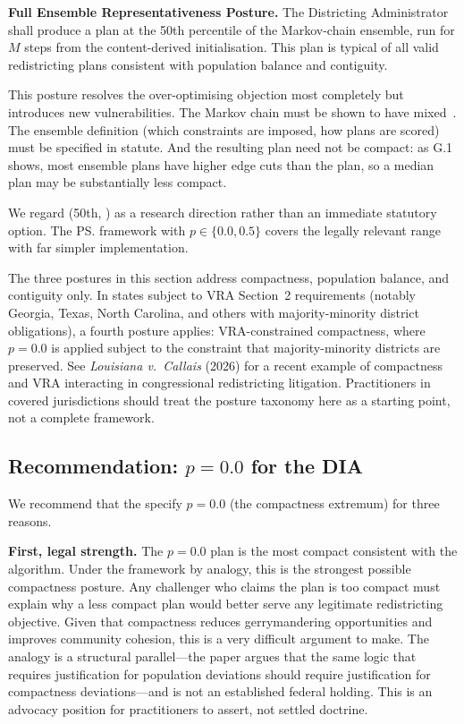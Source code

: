\begin{statute}
\textbf{Full Ensemble Representativeness Posture.}
The Districting Administrator shall produce a plan at the 50th percentile
of the \recom{} Markov-chain ensemble, run for $M$ steps from the
content-derived initialisation.
This plan is typical of all valid redistricting plans consistent with
population balance and contiguity.
\end{statute}

This posture resolves the over-optimising objection most completely but
introduces new vulnerabilities.
The Markov chain must be shown to have mixed~\citep{deford2021}.
The ensemble definition (which constraints are imposed, how plans are scored)
must be specified in statute.
And the resulting plan need not be compact: as G.1 shows, most \recom{}
ensemble plans have higher edge cuts than the \ar{} plan, so a median
\recom{} plan may be substantially less compact.

We regard \ts{}(50th, \recom{}) as a research direction rather than an
immediate statutory option.
The \ps{} framework with $p \in \{0.0, 0.5\}$ covers the legally relevant
range with far simpler implementation.

The three postures in this section address compactness, population balance,
and contiguity only.
In states subject to VRA Section~2 requirements (notably Georgia, Texas,
North Carolina, and others with majority-minority district obligations), a
fourth posture applies: VRA-constrained compactness, where $p{=}0.0$ is
applied subject to the constraint that majority-minority districts are
preserved.
See \emph{Louisiana v.\ Callais} (2026) for a recent example of compactness
and VRA interacting in congressional redistricting litigation.
Practitioners in covered jurisdictions should treat the posture taxonomy
here as a starting point, not a complete framework.

\subsection{Recommendation: $p = 0.0$ for the DIA}

We recommend that the \dia{} specify $p = 0.0$ (the compactness extremum)
for three reasons.

\textbf{First, legal strength.}
The $p = 0.0$ plan is the most compact consistent with the algorithm.
Under the \karcher{} framework by analogy, this is the strongest possible
compactness posture.
Any challenger who claims the plan is too compact must explain why a less
compact plan would better serve any legitimate redistricting objective.
Given that compactness reduces gerrymandering opportunities and improves
community cohesion, this is a very difficult argument to make.
The \karcher{} analogy is a structural parallel---the paper argues that the
same logic that requires justification for population deviations should
require justification for compactness deviations---and is not an established
federal holding.
This is an advocacy position for practitioners to assert, not settled
doctrine.

